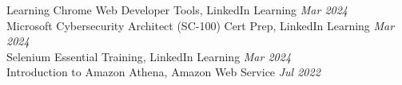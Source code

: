 \documentclass[10pt, letterpaper]{article}
\begin{document}
Learning Chrome Web Developer Tools, LinkedIn Learning \hfill \textit{Mar 2024} \\
Microsoft Cybersecurity Architect (SC-100) Cert Prep, LinkedIn Learning \hfill \textit{Mar 2024} \\
Selenium Essential Training, LinkedIn Learning \hfill \textit{Mar 2024} \\
Introduction to Amazon Athena, Amazon Web Service \hfill \textit{Jul 2022}
\end{document}
